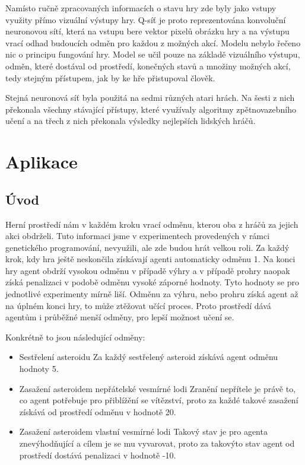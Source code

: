 Namísto ručně zpracovaných informacích o stavu hry zde byly jako vstupy využity přímo vizuální výstupy hry.
Q-síť je proto reprezentována konvoluční neuronovou sítí, která na vstupu bere vektor pixelů obrázku hry a na výstupu vrací odhad budoucích odměn pro každou z možných akcí.
Modelu nebylo řečeno nic o principu fungování hry. Model se učil pouze na základě vizuálního výstupu, odměn, které dostával od prostředí, konečných stavů a množiny možných akcí, tedy stejným přístupem, jak by ke hře přistupoval člověk.

Stejná neuronová síť byla použitá na sedmi různých atari hrách. Na šesti z nich překonala všechny stávající přístupy, které využívaly algoritmy zpětnovazebního učení a na třech z nich překonala výsledky nejlepších lidských hráčů.



\section{Aplikace}
\subsection{Úvod}
Herní prostředí nám v každém kroku vrací odměnu, kterou oba z hráčů za jejich akci obdrželi. Tuto informaci jsme v experimentech provedených v rámci genetického programování, nevyužili, ale zde budou hrát velkou roli.
Za každý krok, kdy hra ještě neskončila získávají agenti automaticky odměnu 1. Na konci hry agent obdrží vysokou odměnu v případě výhry a v případě prohry naopak získá penalizaci v podobě odměnu vysoké záporné hodnoty. Tyto hodnoty se pro jednotlivé experimenty mírně liší.
Odměnu za výhru, nebo prohru získá agent až na úplném konci hry, to může ztěžovat učící proces. Proto prostředí dává agentům i průběžné menší odměny, pro lepší možnost učení se.

Konkrétně to jsou následující odměny:
\begin{itemize}
    \item Sestřelení asteroidu
        \newline
        Za každý sestřelený asteroid získává agent odměnu hodnoty 5.
    \item Zasažení asteroidem nepřátelské vesmírné lodi
        \newline
        Zranění nepřítele je právě to, co agent potřebuje pro přiblížění se vítězství, proto za každé takové zasažení získává od prostředí odměnu v hodnotě 20.
    \item Zasažení asteroidem vlastní vesmírné lodi
        \newline
        Takový stav je pro agenta znevýhodňující a cílem je se mu vyvarovat, proto za takovýto stav agent od prostředí dostává penalizaci v hodnotě -10.
\end{itemize}


